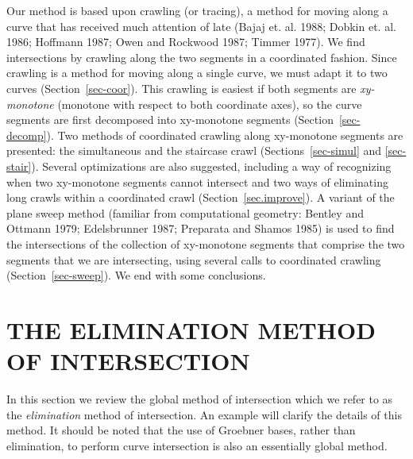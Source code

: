 Our method is based upon crawling (or tracing), a method for moving along a curve that has 
received much attention of late (Bajaj et. al. 1988; Dobkin et. al. 1986; Hoffmann 1987;
Owen and Rockwood 1987; Timmer 1977).
We find intersections by crawling along the two segments in a coordinated fashion.
Since crawling is a method for moving along a single curve, we must adapt it to two curves
(Section~\ref{sec-coor}).
This crawling is easiest if both segments are {\em xy-monotone} (monotone with 
respect to both coordinate axes), so the curve segments are first decomposed into 
xy-monotone segments (Section~\ref{sec-decomp}).
Two methods of coordinated crawling along xy-monotone segments are presented: 
the simultaneous and the staircase crawl (Sections~\ref{sec-simul} and \ref{sec-stair}).
Several optimizations are also suggested,
including a way of recognizing when two xy-monotone segments cannot intersect 
and two ways of eliminating long crawls within a coordinated crawl (Section~\ref{sec.improve}).
A variant of the plane sweep method (familiar from computational geometry:
Bentley and Ottmann 1979; Edelsbrunner 1987; Preparata and Shamos 1985) is used to find
the intersections of the collection of xy-monotone segments that comprise the two segments
that we are intersecting, using several calls to coordinated crawling (Section~\ref{sec-sweep}).
We end with some conclusions.

\section{THE ELIMINATION METHOD OF INTERSECTION}
\label{sec-soe}

In this section we review the global method of intersection 
which we refer to as the {\em elimination} method of intersection.
An example will clarify the details of this method.
It should be noted that the use of Groebner bases, rather than elimination, to perform
curve intersection is also an essentially global method.


